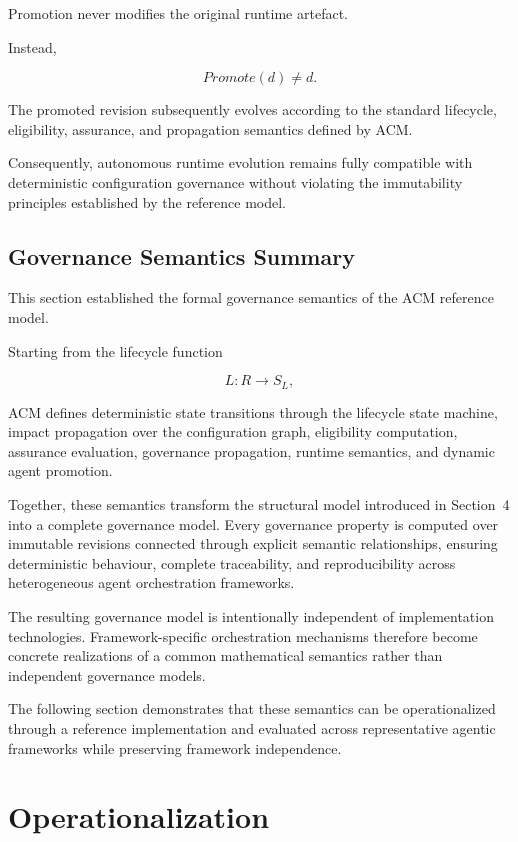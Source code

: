 \documentclass[10pt]{article}
\begin{document}
Promotion never modifies the original runtime artefact.

Instead,

\[
Promote(d)
\neq
d.
\]

The promoted revision subsequently evolves according to the standard lifecycle, eligibility, assurance, and propagation semantics defined by ACM.

Consequently, autonomous runtime evolution remains fully compatible with deterministic configuration governance without violating the immutability principles established by the reference model.

\subsection{Governance Semantics Summary}
\label{sec:governance_summary}

This section established the formal governance semantics of the ACM reference model.

Starting from the lifecycle function

\[
L:R\rightarrow S_L,
\]

ACM defines deterministic state transitions through the lifecycle state machine, impact propagation over the configuration graph, eligibility computation, assurance evaluation, governance propagation, runtime semantics, and dynamic agent promotion.

Together, these semantics transform the structural model introduced in Section~4 into a complete governance model. Every governance property is computed over immutable revisions connected through explicit semantic relationships, ensuring deterministic behaviour, complete traceability, and reproducibility across heterogeneous agent orchestration frameworks.

The resulting governance model is intentionally independent of implementation technologies. Framework-specific orchestration mechanisms therefore become concrete realizations of a common mathematical semantics rather than independent governance models.

The following section demonstrates that these semantics can be operationalized through a reference implementation and evaluated across representative agentic frameworks while preserving framework independence.

\section{Operationalization}
\label{sec:operationalization}
\end{document}
